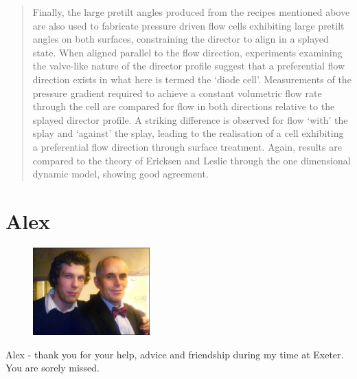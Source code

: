 \documentclass[prb,reprint,superscriptaddress,showpacs]{revtex4-1}
\begin{document}
\begin{abstract}
Finally, the large pretilt angles produced from the recipes mentioned above are also used to fabricate pressure driven flow cells exhibiting large pretilt angles on both surfaces, constraining the director to align in a splayed state. When aligned parallel to the flow direction, experiments examining the valve-like nature of the director profile suggest that a preferential flow direction exists in what here is termed the `diode cell'. Measurements of the pressure gradient required to achieve a constant volumetric flow rate through the cell are compared for flow in both directions relative to the splayed director profile. A striking difference is observed for flow `with' the splay and `against' the splay, leading to the realisation of a cell exhibiting a preferential flow direction through surface treatment. Again, results are compared to the theory of Ericksen and Leslie through the one dimensional dynamic model, showing good agreement.
\end{abstract}

\maketitle



\pagestyle{fancy}




% 
% 
% 
% 
% 
% 

% 


\section{Alex}
\begin{figure}[h]
\begin{center}
\includegraphics[width=0.4\textwidth]{figures/alex.jpg}
\end{center}
\end{figure}

\begin{center}
Alex - thank you for your help, advice and friendship during my time at Exeter. You are sorely missed.
\end{center}
\end{document}
